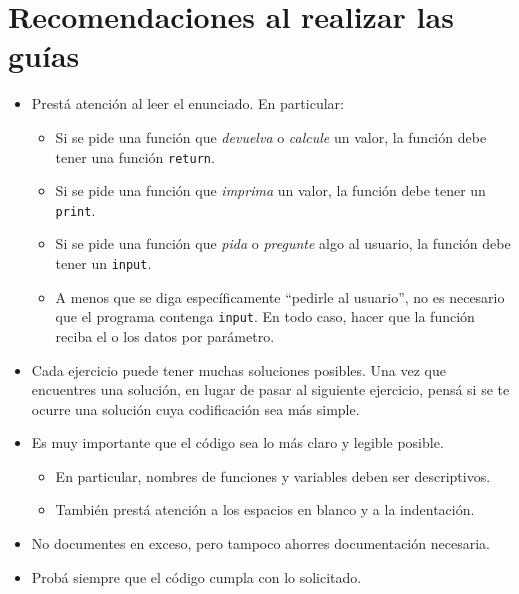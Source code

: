 \documentclass[
  letterpaper,
  DIV=11,
  numbers=noendperiod]{scrreprt}
\providecommand{\tightlist}{%
  \setlength{\itemsep}{0pt}\setlength{\parskip}{0pt}}\usepackage{longtable,booktabs,array}
\begin{document}
\section*{Recomendaciones al realizar las
guías}\label{recomendaciones-al-realizar-las-guuxedas}


\begin{itemize}
\tightlist
\item
  Prestá atención al leer el enunciado. En particular:

  \begin{itemize}
  \tightlist
  \item
    Si se pide una función que \emph{devuelva} o \emph{calcule} un
    valor, la función debe tener una función \texttt{return}.
  \item
    Si se pide una función que \emph{imprima} un valor, la función debe
    tener un \texttt{print}.
  \item
    Si se pide una función que \emph{pida} o \emph{pregunte} algo al
    usuario, la función debe tener un \texttt{input}.
  \item
    A menos que se diga específicamente ``pedirle al usuario'', no es
    necesario que el programa contenga \texttt{input}. En todo caso,
    hacer que la función reciba el o los datos por parámetro.
  \end{itemize}
\item
  Cada ejercicio puede tener muchas soluciones posibles. Una vez que
  encuentres una solución, en lugar de pasar al siguiente ejercicio,
  pensá si se te ocurre una solución cuya codificación sea más simple.
\item
  Es muy importante que el código sea lo más claro y legible posible.

  \begin{itemize}
  \tightlist
  \item
    En particular, nombres de funciones y variables deben ser
    descriptivos.
  \item
    También prestá atención a los espacios en blanco y a la indentación.
  \end{itemize}
\item
  No documentes en exceso, pero tampoco ahorres documentación necesaria.
\item
  Probá siempre que el código cumpla con lo solicitado.
\end{itemize}
\end{document}
